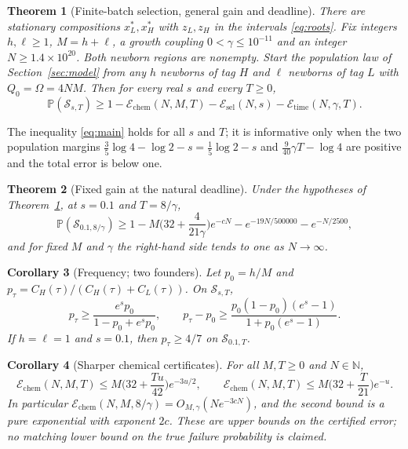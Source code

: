 \documentclass[11pt,a4paper]{article}
\theoremstyle{plain}
\newtheorem{theorem}{Theorem}[section]
\newtheorem{corollary}[theorem]{Corollary}
\theoremstyle{definition}
\theoremstyle{remark}
\newcommand{\N}{\mathbb N}
\newcommand{\Prb}{\mathbb P}
\newcommand{\cS}{\mathcal S}
\newcommand{\chem}{\mathcal E_{\mathrm{chem}}}
\newcommand{\Esel}{\mathcal E_{\mathrm{sel}}}
\newcommand{\Etime}{\mathcal E_{\mathrm{time}}}
\begin{document}
\begin{theorem}[Finite-batch selection, general gain and deadline]\label{thm:family}
There are stationary compositions $x_L^*,x_H^*$ with $z_L,z_H$ in the intervals \eqref{eq:roots}. Fix integers $h,\ell\geq1$, $M=h+\ell$, a growth coupling $0<\gamma\leq10^{-11}$ and an integer $N\geq1.4\times10^{20}$. Both newborn regions are nonempty. Start the population law of Section~\ref{sec:model} from any $h$ newborns of tag $H$ and $\ell$ newborns of tag $L$ with $Q_0=\Omega=4NM$. Then for every real $s$ and every $T\geq0$,
\begin{equation}\label{eq:main}
\Prb(\cS_{s,T})\geq1-\chem(N,M,T)-\Esel(N,s)-\Etime(N,\gamma,T).
\end{equation}
\end{theorem}

The inequality \eqref{eq:main} holds for all $s$ and $T$; it is informative only when the two population margins $\frac35\log4-\log2-s=\frac15\log2-s$ and $\frac9{40}\gamma T-\log4$ are positive and the total error is below one.

\begin{theorem}[Fixed gain at the natural deadline]\label{thm:main}
Under the hypotheses of Theorem~\ref{thm:family}, at $s=0.1$ and $T=8/\gamma$,
\begin{equation}\label{eq:original}
\Prb(\cS_{0.1,8/\gamma})\geq1-M\Big(32+\frac{4}{21\gamma}\Big)e^{-cN}-e^{-19N/500000}-e^{-N/2500},
\end{equation}
and for fixed $M$ and $\gamma$ the right-hand side tends to one as $N\to\infty$.
\end{theorem}

\begin{corollary}[Frequency; two founders]\label{cor:frequency}
Let $p_0=h/M$ and $p_\tau=C_H(\tau)/(C_H(\tau)+C_L(\tau))$. On $\cS_{s,T}$,
\begin{equation}\label{eq:frequency}
p_\tau\geq\frac{e^{s}p_0}{1-p_0+e^{s}p_0},\qquad p_\tau-p_0\geq\frac{p_0(1-p_0)(e^{s}-1)}{1+p_0(e^{s}-1)}.
\end{equation}
If $h=\ell=1$ and $s=0.1$, then $p_\tau\geq4/7$ on $\cS_{0.1,T}$.
\end{corollary}

\begin{corollary}[Sharper chemical certificates]\label{cor:sharp}
For all $M,T\geq0$ and $N\in\N$,
\begin{equation}\label{eq:sharp}
\chem(N,M,T)\leq M\Big(32+\frac{Tu}{42}\Big)e^{-3u/2},\qquad \chem(N,M,T)\leq M\Big(32+\frac T{21}\Big)e^{-u}.
\end{equation}
In particular $\chem(N,M,8/\gamma)=O_{M,\gamma}(Ne^{-3cN})$, and the second bound is a pure exponential with exponent $2c$. These are upper bounds on the certified error; no matching lower bound on the true failure probability is claimed.
\end{corollary}
\end{document}
